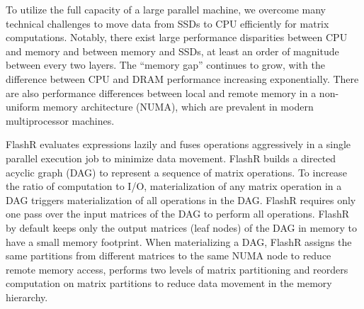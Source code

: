 

To utilize the full capacity of a large parallel machine, we overcome
many technical challenges to move data from SSDs to CPU efficiently for matrix
computations. Notably, there exist large performance disparities between CPU
and memory and between memory and SSDs, at least an order of magnitude between
every two layers. The ``memory gap'' \cite{Wilkes01} continues to grow, with 
the difference between CPU and DRAM performance increasing exponentially. 
There are also performance differences between
local and remote memory in a non-uniform memory architecture (NUMA), which are prevalent
in modern multiprocessor machines. 

FlashR evaluates expressions lazily and fuses operations aggressively
in a single parallel execution job to minimize data movement. FlashR
builds a directed acyclic graph (DAG) to represent a sequence of matrix
operations. To increase the ratio of computation to I/O, materialization
of any matrix operation in a DAG triggers materialization of all operations
in the DAG. FlashR requires only one pass over the input matrices of
the DAG to perform all operations. FlashR by default keeps only the output
matrices (leaf nodes) of the DAG in memory to have a small memory footprint.
When materializing a DAG, FlashR assigns the same partitions from
different matrices to the same NUMA node
to reduce remote memory access, performs two levels of matrix partitioning
and reorders computation on matrix partitions to reduce data movement
in the memory hierarchy.

